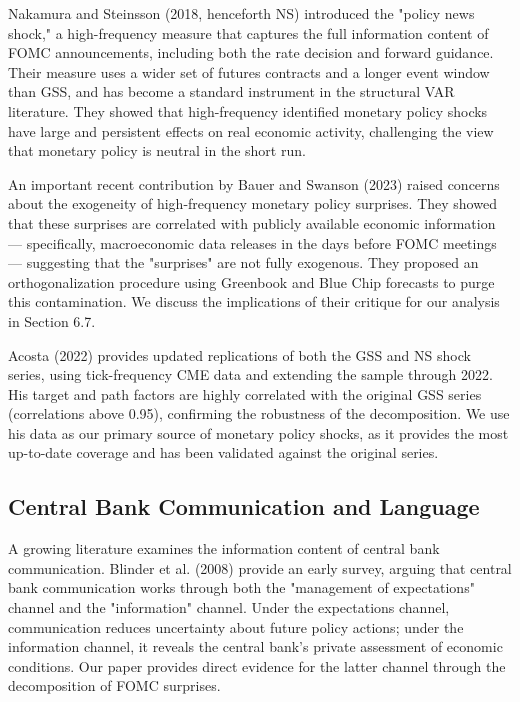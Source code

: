 \documentclass[12pt]{article}
\begin{document}
Nakamura and Steinsson (2018, henceforth NS) introduced the "policy news shock," a high-frequency measure that captures the full information content of FOMC announcements, including both the rate decision and forward guidance. Their measure uses a wider set of futures contracts and a longer event window than GSS, and has become a standard instrument in the structural VAR literature. They showed that high-frequency identified monetary policy shocks have large and persistent effects on real economic activity, challenging the view that monetary policy is neutral in the short run.

An important recent contribution by Bauer and Swanson (2023) raised concerns about the exogeneity of high-frequency monetary policy surprises. They showed that these surprises are correlated with publicly available economic information --- specifically, macroeconomic data releases in the days before FOMC meetings --- suggesting that the "surprises" are not fully exogenous. They proposed an orthogonalization procedure using Greenbook and Blue Chip forecasts to purge this contamination. We discuss the implications of their critique for our analysis in Section 6.7.

Acosta (2022) provides updated replications of both the GSS and NS shock series, using tick-frequency CME data and extending the sample through 2022. His target and path factors are highly correlated with the original GSS series (correlations above 0.95), confirming the robustness of the decomposition. We use his data as our primary source of monetary policy shocks, as it provides the most up-to-date coverage and has been validated against the original series.

\subsection{Central Bank Communication and Language}

A growing literature examines the information content of central bank communication. Blinder et al. (2008) provide an early survey, arguing that central bank communication works through both the "management of expectations" channel and the "information" channel. Under the expectations channel, communication reduces uncertainty about future policy actions; under the information channel, it reveals the central bank's private assessment of economic conditions. Our paper provides direct evidence for the latter channel through the decomposition of FOMC surprises.
\end{document}
